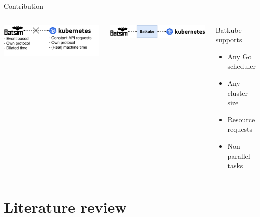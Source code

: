 \documentclass[12pt, aspectratio=43]{beamer}
\begin{document}
\begin{frame}{Contribution}
	\begin{columns}
		\includegraphics[width=\textwidth]{../imgs/problematic.pdf}

		\vspace{1cm}

		\includegraphics[width=\textwidth]{../imgs/contribution.pdf}

		\begin{exampleblock}{Batkube supports}
			\begin{itemize}
				\item Any Go scheduler
				\item Any cluster size
				\item Resource requests
				\item Non parallel tasks
			\end{itemize}
		\end{exampleblock}
	\end{columns}
\end{frame}

\section{Literature review}
\end{document}
